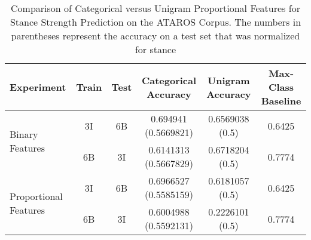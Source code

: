 \begin{table}[h]
\centering
\begin{tabular}{l c c c c c}
	\textbf{Experiment} & \textbf{Train} & \textbf{Test} & \textbf{Categorical Accuracy} & \textbf{Unigram Accuracy} & \textbf{Max-Class Baseline} \\
	\hline
	\multirow{2}{*}{Binary Features} 
	   & 3I  & 6B  & \num{0.694941} (\num{0.5669821})  & \num{0.6569038} (\num{0.5}) & \num{0.6425} \\ 
	   & 6B  & 3I  & \num{0.6141313} (\num{0.5667829}) & \num{0.6718204} (\num{0.5}) & \num{0.7774} \\ 	
	\hline
	\multirow{2}{*}{Proportional Features} 
	   & 3I  & 6B  & \num{0.6966527} (\num{0.5585159})  & \num{0.6181057} (\num{0.5}) & \num{0.6425} \\ 
	   & 6B  & 3I  & \num{0.6004988} (\num{0.5592131}) & \num{0.2226101} (\num{0.5}) &  \num{0.7774} \\ 	

\end{tabular}
\caption{Comparison of Categorical versus Unigram Proportional Features for Stance Strength Prediction on the ATAROS Corpus.  The numbers in parentheses represent the accuracy on a test set that was normalized for stance}
\label{tab:cat_vs_unigram_feats_WVS}
\end{table}


%
%	
%


